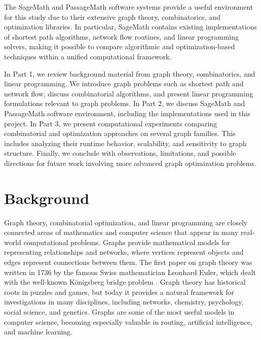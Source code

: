 \documentclass[12pt]{report}
\begin{document}
The SageMath and PassageMath software systems provide a useful environment for this study due to their extensive graph theory, combinatorics, and optimization libraries. In particular, SageMath contains existing implementations of shortest path algorithms, network flow routines, and linear programming solvers, making it possible to compare algorithmic and optimization-based techniques within a unified computational framework.

In Part 1, we review background material from graph theory, combinatorics, and linear programming. We introduce graph problems such as shortest path and network flow, discuss combinatorial algorithms, and present linear programming formulations relevant to graph problems. In Part 2, we discuss SageMath and PassageMath software environment, including the implementations used in this project. In Part 3, we present computational experiments comparing combinatorial and optimization approaches on several graph families. This includes analyzing their runtime behavior, scalability, and sensitivity to graph structure. Finally, we conclude with observations, limitations, and possible directions for future work involving more advanced graph optimization problems.


\chapter{Background}

Graph theory, combinatorial optimization, and linear programming are closely connected areas of mathematics and computer science that appear in many real-world computational problems. Graphs provide mathematical models for representing relationships and networks, where vertices represent objects and edges represent connections between them. The first paper on graph theory was written in 1736 by the famous Swiss mathematician Leonhard Euler, which dealt with the well-known K\"onigsberg bridge problem \cite{Brualdi}. Graph theory has historical roots in puzzles and games, but today it provides a natural framework for investigations in many disciplines, including networks, chemistry, psychology, social science, and genetics. Graphs are some of the most useful models in computer science, becoming especially valuable in routing, artificial intelligence, and machine learning.

\end{document}
